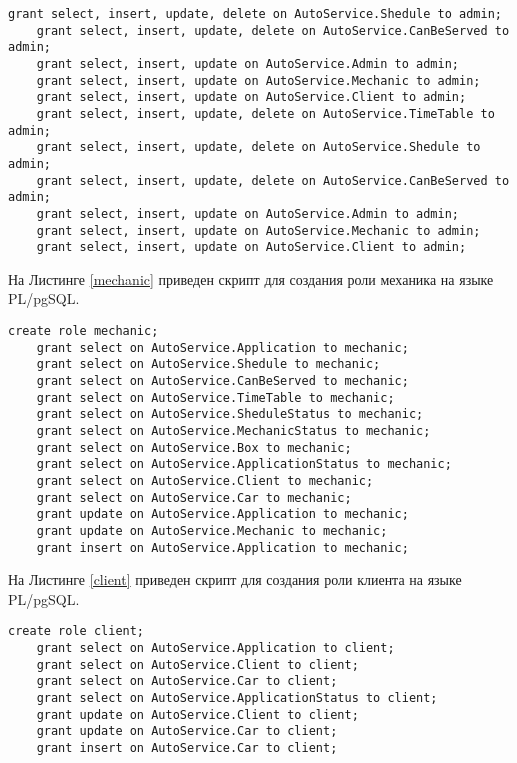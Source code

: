 \begin{lstlisting}[label=admin2, style=mystyle, caption=Скрипт для создания роли администратора на языке PL/pgSQL(ч. 2)]
	grant select, insert, update, delete on AutoService.Shedule to admin;
	grant select, insert, update, delete on AutoService.CanBeServed to admin;
	grant select, insert, update on AutoService.Admin to admin;
	grant select, insert, update on AutoService.Mechanic to admin;
	grant select, insert, update on AutoService.Client to admin;
	grant select, insert, update, delete on AutoService.TimeTable to admin;
	grant select, insert, update, delete on AutoService.Shedule to admin;
	grant select, insert, update, delete on AutoService.CanBeServed to admin;
	grant select, insert, update on AutoService.Admin to admin;
	grant select, insert, update on AutoService.Mechanic to admin;
	grant select, insert, update on AutoService.Client to admin;
\end{lstlisting}

На Листинге \ref{mechanic} приведен скрипт для создания роли механика на языке PL/pgSQL.

\begin{lstlisting}[label=mechanic, style=mystyle, caption=Скрипт для создания роли механика на языке PL/pgSQL]
	create role mechanic;
	grant select on AutoService.Application to mechanic;
	grant select on AutoService.Shedule to mechanic;
	grant select on AutoService.CanBeServed to mechanic;
	grant select on AutoService.TimeTable to mechanic;
	grant select on AutoService.SheduleStatus to mechanic;
	grant select on AutoService.MechanicStatus to mechanic;
	grant select on AutoService.Box to mechanic;
	grant select on AutoService.ApplicationStatus to mechanic;
	grant select on AutoService.Client to mechanic;
	grant select on AutoService.Car to mechanic;
	grant update on AutoService.Application to mechanic;
	grant update on AutoService.Mechanic to mechanic;
	grant insert on AutoService.Application to mechanic;
\end{lstlisting}

На Листинге \ref{client} приведен скрипт для создания роли клиента на языке PL/pgSQL.

\newpage

\begin{lstlisting}[label=client, style=mystyle, caption=Скрипт для создания роли клиента на языке PL/pgSQL]
	create role client;
	grant select on AutoService.Application to client;
	grant select on AutoService.Client to client;
	grant select on AutoService.Car to client;
	grant select on AutoService.ApplicationStatus to client;
	grant update on AutoService.Client to client;
	grant update on AutoService.Car to client;
	grant insert on AutoService.Car to client;
\end{lstlisting}

